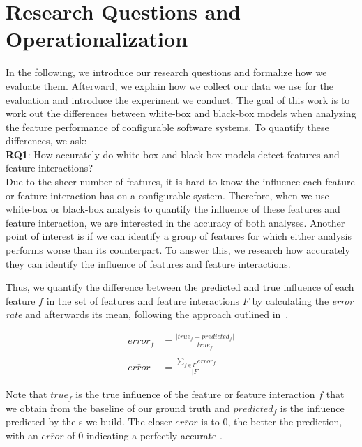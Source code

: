 \section{Research Questions and Operationalization}\label{ch:operationalization}

In the following, we introduce our \hyperref[researchQuestions]{research questions} and formalize how we evaluate them. Afterward,
we explain how we collect our data we use for the evaluation and introduce the experiment we conduct. 
The goal of this work is to work out the differences between white-box and black-box models when analyzing the feature performance of configurable
software systems. 
To quantify these differences, we ask:\\

\noindent \textbf{RQ1}: How accurately do white-box and black-box models detect features and feature interactions? \\

Due to the sheer number of features, it is hard to know the influence each feature or feature interaction has on a configurable system. 
Therefore, when we use white-box or black-box analysis to quantify the influence of these features and feature interaction, 
we are interested in the accuracy of both analyses. 
Another point of interest is if we can identify a group of features for which either analysis performs worse than its counterpart.
To answer this, we research how accurately they can identify the influence of features and feature interactions.

Thus, we quantify the difference between the predicted and true influence of each feature $f$ in the set of features and feature interactions $F$
by calculating the \emph{error rate} and afterwards its mean, following the approach outlined in~\cite{mape}. %


\begin{align}
    error_f &= \frac{\lvert true_f - predicted_f \rvert}{true_f} \label{equ:APE_RQ1} \\ \nonumber \\
    \overline{error}  &= \frac{\sum_{f \in F} error_f}{\lvert F \rvert} \label{equ:MAPE_RQ1}
\end{align}

Note that $true_f$ is the true influence of the feature or feature interaction $f$ that we obtain from the baseline of our ground truth 
and $predicted_f$ is the influence predicted by the {\perfInfluenceModel}s we build.
The closer $\overline{error}$ is to $0$, the better the prediction, with an $\overline{error}$ of 0 indicating a perfectly
accurate \perfInfluenceModel. 

